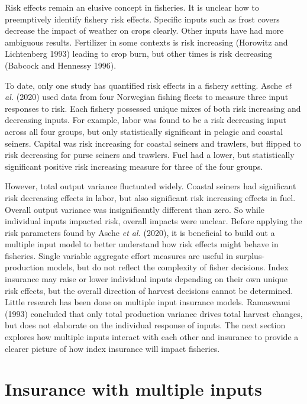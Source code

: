 \documentclass[
  letterpaper,
  DIV=11,
  numbers=noendperiod]{scrartcl}
\theoremstyle{plain}
\theoremstyle{plain}
\theoremstyle{remark}
\begin{document}
Risk effects remain an elusive concept in fisheries. It is unclear how
to preemptively identify fishery risk effects. Specific inputs such as
frost covers decrease the impact of weather on crops clearly. Other
inputs have had more ambiguous results. Fertilizer in some contexts is
risk increasing (Horowitz and Lichtenberg 1993) leading to crop burn,
but other times is risk decreasing (Babcock and Hennessy 1996).

To date, only one study has quantified risk effects in a fishery
setting. Asche \emph{et al.} (2020) used data from four Norwegian
fishing fleets to measure three input responses to risk. Each fishery
possessed unique mixes of both risk increasing and decreasing inputs.
For example, labor was found to be a risk decreasing input across all
four groups, but only statistically significant in pelagic and coastal
seiners. Capital was risk increasing for coastal seiners and trawlers,
but flipped to risk decreasing for purse seiners and trawlers. Fuel had
a lower, but statistically significant positive risk increasing measure
for three of the four groups.

However, total output variance fluctuated widely. Coastal seiners had
significant risk decreasing effects in labor, but also significant risk
increasing effects in fuel. Overall output variance was insignificantly
different than zero. So while individual inputs impacted risk, overall
impacts were unclear. Before applying the risk parameters found by Asche
\emph{et al.} (2020), it is beneficial to build out a multiple input
model to better understand how risk effects might behave in fisheries.
Single variable aggregate effort measures are useful in
surplus-production models, but do not reflect the complexity of fisher
decisions. Index insurance may raise or lower individual inputs
depending on their own unique risk effects, but the overall direction of
harvest decisions cannot be determined. Little research has been done on
multiple input insurance models. Ramaswami (1993) concluded that only
total production variance drives total harvest changes, but does not
elaborate on the individual response of inputs. The next section
explores how multiple inputs interact with each other and insurance to
provide a clearer picture of how index insurance will impact fisheries.

\hypertarget{sec-multi}{%
\section{Insurance with multiple inputs}\label{sec-multi}}
\end{document}
